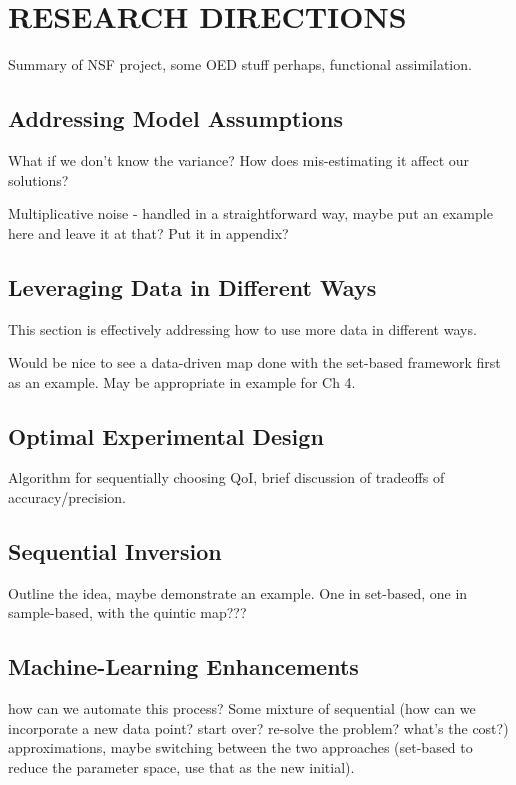 \chapter{\uppercase{Research Directions} \label{chapter:05}}

Summary of NSF project, some OED stuff perhaps, functional assimilation.

\section{Addressing Model Assumptions}\label{sec:ch05-variance}

What if we don't know the variance? How does mis-estimating it affect our solutions? 

Multiplicative noise - handled in a straightforward way, maybe put an example here and leave it at that? Put it in appendix? 


\section{Leveraging Data in Different Ways}\label{sec:ch05-data}

This section is effectively addressing how to use more data in different ways.

Would be nice to see a data-driven map done with the set-based framework first as an example.
May be appropriate in example for Ch 4. 

\section{Optimal Experimental Design}\label{sec:ch05-oed}

Algorithm for sequentially choosing QoI, brief discussion of tradeoffs of accuracy/precision.

\section{Sequential Inversion}\label{sec:ch05-sequential}

Outline the idea, maybe demonstrate an example. One in set-based, one in sample-based, with the quintic map???

\section{Machine-Learning Enhancements}\label{sec:ch05-ml}

how can we automate this process? Some mixture of sequential (how can we incorporate a new data point? start over? re-solve the problem? what's the cost?) approximations, maybe switching between the two approaches (set-based to reduce the parameter space, use that as the new initial). 
